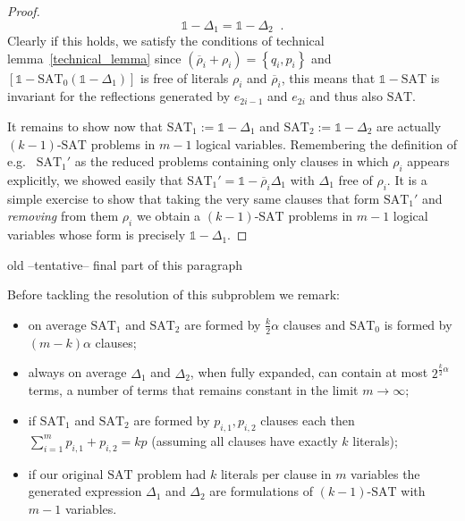 \documentclass[a4paper,twoside,11pt]{article}
\begin{document}
{\begin{proof}
$$
{\ensuremath{\mathbb{1}}} - \Delta_1 = {\ensuremath{\mathbb{1}}} - \Delta_2 {\;\; \mathrm{.}}
$$
Clearly if this holds, we satisfy the conditions of technical lemma~\ref{technical_lemma} since $({\overline{\ensuremath{\rho}}}_i + {\ensuremath{\rho}}_i) = {\ensuremath{\left\{ {q_i}, {p_i} \right\}}}$ and $\left[{\ensuremath{\mathbb{1}}} - {\ensuremath{\mbox{SAT}}}_0 ({\ensuremath{\mathbb{1}}} - \Delta_1)\right]$ is free of literals ${\ensuremath{\rho}}_i$ and ${\overline{\ensuremath{\rho}}}_i$, this means that ${\ensuremath{\mathbb{1}}} - {\ensuremath{\mbox{SAT}}}$ is invariant for the reflections generated by ${e}_{2 i - 1}$ and ${e}_{2 i}$ and thus also {\ensuremath{\mbox{SAT}}}.

It remains to show now that ${\ensuremath{\mbox{SAT}}}_1 := {\ensuremath{\mathbb{1}}} - \Delta_1$ and ${\ensuremath{\mbox{SAT}}}_2 := {\ensuremath{\mathbb{1}}} - \Delta_2$ are actually $(k-1)$-{\ensuremath{\mbox{SAT}}}{} problems in $m - 1$ logical variables. Remembering the definition of {e.g.\ } ${\ensuremath{\mbox{SAT}}}_1'$ as the reduced problems containing only clauses in which ${\ensuremath{\rho}}_i$ appears explicitly, we showed easily that ${\ensuremath{\mbox{SAT}}}_1' = {\ensuremath{\mathbb{1}}} - {\overline{\ensuremath{\rho}}}_i \Delta_1$ with $\Delta_1$ free of ${\ensuremath{\rho}}_i$. It is a simple exercise to show that taking the very same clauses that form ${\ensuremath{\mbox{SAT}}}_1'$ and \emph{removing} from them ${\ensuremath{\rho}}_i$ we obtain a $(k-1)$-{\ensuremath{\mbox{SAT}}}{} problems in $m - 1$ logical variables whose form is precisely ${\ensuremath{\mathbb{1}}} - \Delta_1$.
\end{proof}

\bigskip

\noindent old --tentative-- final part of this paragraph

Before tackling the resolution of this subproblem we remark:
\begin{itemize}
\item on average ${\ensuremath{\mbox{SAT}}}_1$ and ${\ensuremath{\mbox{SAT}}}_2$ are formed by $\frac{k}{2} \alpha$ clauses and ${\ensuremath{\mbox{SAT}}}_0$ is formed by $(m - k) \alpha$ clauses;
\item always on average $\Delta_1$ and $\Delta_2$, when fully expanded, can contain at most $2^{\frac{k}{2} \alpha}$ terms, a number of terms that remains constant in the limit $m \to \infty$;
\item if ${\ensuremath{\mbox{SAT}}}_1$ and ${\ensuremath{\mbox{SAT}}}_2$ are formed by $p_{i,1}, p_{i,2}$ clauses each then $\sum_{i = 1}^m p_{i,1} + p_{i,2} = k p$ (assuming all clauses have exactly $k$ literals);
\item if our original {\ensuremath{\mbox{SAT}}}{} problem had $k$ literals per clause in $m$ variables the generated expression $\Delta_1$ and $\Delta_2$ are formulations of $(k-1)$-{\ensuremath{\mbox{SAT}}}{} with $m-1$ variables.


\end{itemize}}
\end{document}
